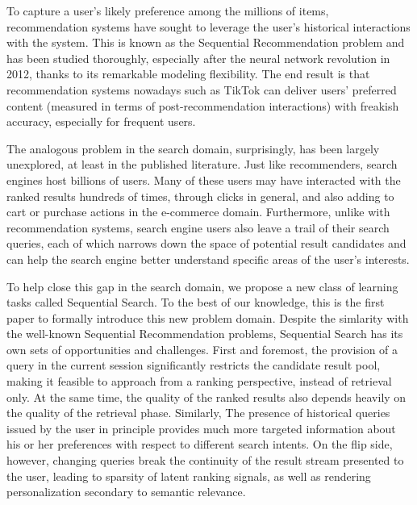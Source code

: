 To capture a user's likely preference among the millions of items, recommendation systems have sought to leverage the user's historical interactions with the system. This is known as the Sequential Recommendation problem and has been studied thoroughly, especially after the neural network revolution in 2012, thanks to its remarkable modeling flexibility. The end result is that recommendation systems nowadays such as TikTok can deliver users' preferred content (measured in terms of post-recommendation interactions) with freakish accuracy, especially for frequent users. 

The analogous problem in the search domain, surprisingly, has been largely unexplored, at least in the published literature. Just like recommenders, search engines host billions of users. Many of these users may have interacted with the ranked results hundreds of times, through clicks in general, and also adding to cart or purchase actions in the e-commerce domain. Furthermore, unlike with recommendation systems, search engine users also leave a trail of their search queries, each of which narrows down the space of potential result candidates and can help the search engine better understand specific areas of the user's interests.

To help close this gap in the search domain, we propose a new class of learning tasks called Sequential Search. To the best of our knowledge, this is the first paper to formally introduce this new problem domain. Despite the simlarity with the well-known Sequential Recommendation problems, Sequential Search has its own sets of opportunities and challenges. First and foremost, the provision of a query in the current session significantly restricts the candidate result pool, making it feasible to approach from a ranking perspective, instead of retrieval only. At the same time, the quality of the ranked results also depends heavily on the quality of the retrieval phase. Similarly, The presence of historical queries issued by the user in principle provides much more targeted information about his or her preferences with respect to different search intents. On the flip side, however, changing queries break the continuity of the result stream presented to the user, leading to sparsity of latent ranking signals, as well as rendering personalization secondary to semantic relevance.

